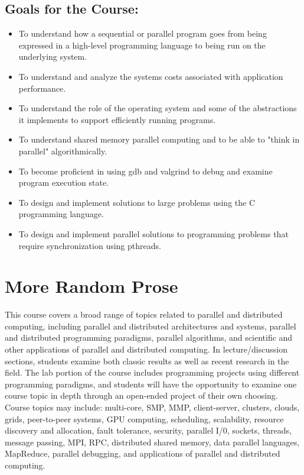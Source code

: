 \documentclass[twocolumn]{article}
\begin{document}
\subsection {Goals for the Course:}

\begin{itemize}
    \item To understand how a sequential or parallel program goes from being expressed in a high-level programming language to being run on the underlying system.
    \item To understand and analyze the systems costs associated with application performance.
    \item To understand the role of the operating system and some of the abstractions it implements to support efficiently running programs.
    \item To understand shared memory parallel computing and to be able to "think in parallel" algorithmically.
    \item To become proficient in using gdb and valgrind to debug and examine program execution state.
    \item To design and implement solutions to large problems using the C programming language.
    \item To design and implement parallel solutions to programming problems that require synchronization using pthreads. 
\end{itemize}



\section{More Random Prose}

This course covers a broad range of topics related to parallel and distributed computing, including parallel and distributed architectures and systems, parallel and distributed programming paradigms, parallel algorithms, and scientific and other applications of parallel and distributed computing. In lecture/discussion sections, students examine both classic results as well as recent research in the field. The lab portion of the course includes programming projects using different programming paradigms, and students will have the opportunity to examine one course topic in depth through an open-ended project of their own choosing. Course topics may include: multi-core, SMP, MMP, client-server, clusters, clouds, grids, peer-to-peer systems, GPU computing, scheduling, scalability, resource discovery and allocation, fault tolerance, security, parallel I/0, sockets, threads, message passing, MPI, RPC, distributed shared memory, data parallel languages, MapReduce, parallel debugging, and applications of parallel and distributed computing.
\end{document}
